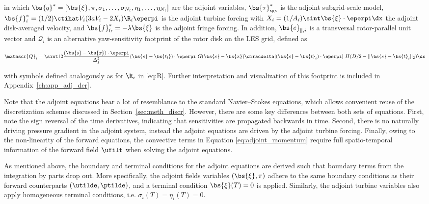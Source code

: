 	in which $\bs{q}^* = [\bs{\xi}, \pi, \sigma_1, \dots, \sigma_{N_t}, \eta_1, \dots, \eta_{N_t}]$ are the adjoint variables, $\bs{\tau}_{\text{sgs}}^*$ is the adjoint subgrid-scale model, $\bs{f}_i^* = (1/2)\ctihat V_i (3a V_i - 2 X_i ) \R_i \eperpi$ is the adjoint turbine forcing with $X_i = (1/A_i)\sint \bs{\xi} \cdot \eperpi \dx$ the adjoint disk-averaged velocity, and $\bs{f}_{\text{fr}}^* = -\lambda \bs{\xi}$ is the adjoint fringe forcing. In addition, $\bs{e}_{\parallel,i}$ is a transversal rotor-parallel unit vector and $\mathscr{Q}_i$ is an alternative yaw-sensitivity footprint of the rotor disk on the LES grid, defined as 
	
	{\small
	\begin{equation}
		\mathscr{Q}_i = \sint 12 \frac{(\bs{s}-\bs{x})\cdot \eperpi}{\Delta_f^2} (\bs{s} - \bs{t_i})\cdot \eperpi \ G(\bs{s} - \bs{x}) \diracdelta [(\bs{s}-\bs{t}_i)\cdot\eperpi] ~ H(D/2-\vert\vert \bs{s}-\bs{t}_i\vert\vert_2) \ds
	\end{equation}
	}
	
	with symbols defined analogously as for $\R_i$ in \eqref{eq:R}. Further interpretation and visualization of this footprint is included in Appendix~\ref{ch:app_adj_der}. 
		
	Note that the adjoint equations bear a lot of resemblance to the standard Navier--Stokes equations, which allows convenient reuse of the discretization schemes discussed in Section~\ref{sec:meth_discr}. However, there are some key differences between both sets of equations. First, note the sign reversal of the time derivatives, indicating that sensitivities are propagated backwards in time. Second, there is no naturally driving pressure gradient in the adjoint system, instead the adjoint equations are driven by the adjoint turbine forcing. Finally, owing to the non-linearity of the forward equations, the convective terms in Equation \eqref{eq:adjoint_momentum} require full spatio-temporal information of the forward field $\ufilt$ when solving the adjoint equations.
	
	As mentioned above, the boundary and terminal conditions for the adjoint equations are derived such that boundary terms from the integration by parts drop out. More specifically, the adjoint fields variables $(\bs{\xi}, \pi)$ adhere to the same boundary conditions as their forward counterparts $(\utilde, \ptilde)$, and a terminal condition $\bs{\xi}(T) = 0$ is applied. Similarly, the adjoint turbine variables also apply homogeneous terminal conditions, i.e. $\sigma_i(T) = \eta_i(T) = 0$. 
	
